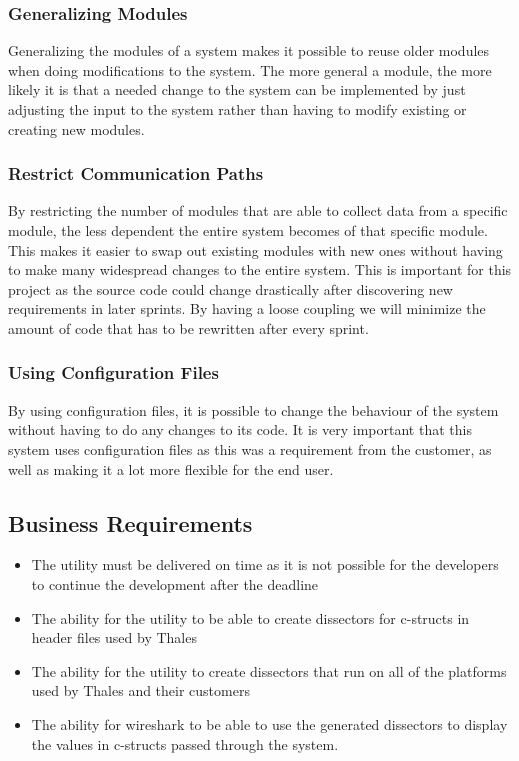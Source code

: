 \subsubsection{Generalizing Modules}
Generalizing the modules of a system makes it possible to reuse older modules when doing modifications to the system. The more general a module, the more likely it is that a needed change to the system can be implemented by just adjusting the input to the system rather than having to modify existing or creating new modules.

\subsubsection{Restrict Communication Paths}
By restricting the number of modules that are able to collect data from a specific module, the less dependent the entire system becomes of that specific module. This makes it easier to swap out existing modules with new ones without having to make many widespread changes to the entire system. This is important for this project as the source code could change drastically after discovering new requirements in later sprints. By having a loose coupling we will minimize the amount of code that has to be rewritten after every sprint.

\subsubsection{Using Configuration Files}
By using configuration files, it is possible to change the behaviour of the system without having to do any changes to its code. It is very important that this system uses configuration files as this was a requirement from the customer, as well as making it a lot more flexible for the end user.

\subsection{Business Requirements}
\begin{itemize}
\item The \gls{utility} must be delivered on time as it is not possible for the developers to continue the development after the deadline
\item The ability for the \gls{utility} to be able to create \glspl{dissector} for \Gls{c}-\glspl{struct} in \gls{header} files used by Thales
\item The ability for the \gls{utility} to create \glspl{dissector} that run on all of the platforms used by Thales and their customers
\item The ability for \Gls{wireshark} to be able to use the generated \glspl{dissector} to display the values in \Gls{c}-\glspl{struct} passed through the system.
\end{itemize}


